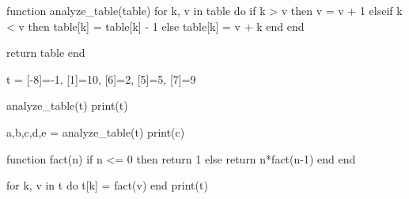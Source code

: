 function analyze_table(table) 
    for k, v in table do
        if k > v then
            v = v + 1
        elseif k < v then
            table[k] = table[k] - 1
        else 
            table[k] = v + k
        end
    end

    return table
end

t = {[-8]=-1, [1]=10, [6]=2, [5]=5, [7]=9}

analyze_table(t)
print(t)

a,b,c,d,e = analyze_table(t)
print(c)

function fact(n)
    if n <= 0 then 
        return 1
    else 
        return n*fact(n-1)
    end
end

for k, v in t do
    t[k] = fact(v)
end
print(t)